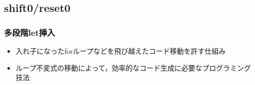 \documentclass[dvipdfmx,cjk,xcolor=dvipsnames,envcountsect,notheorems,12pt]{beamer}
\theoremstyle{definition}
\begin{document}
\subsection{shift0/reset0}

\begin{frame}
  \frametitle{多段階let挿入}

  \begin{itemize}
  \item 入れ子になったforループなどを飛び越えたコード移動を許す仕組み
  \item ループ不変式の移動によって，効率的なコード生成に必要なプログラミング技法
  \end{itemize}
\end{frame}
\end{document}
